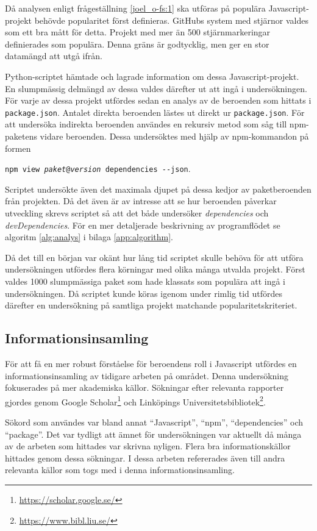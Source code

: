 Då analysen enligt frågeställning \ref{joel_o-fs:1} ska utföras på populära Javascript-projekt behövde popularitet först definieras. GitHubs system med stjärnor valdes som ett bra mått för detta. Projekt med mer än 500 stjärnmarkeringar definierades som populära. Denna gräns är godtycklig, men ger en stor datamängd att utgå ifrån.

Python-scriptet hämtade och lagrade information om dessa Javascript-projekt. En slumpmässig delmängd av dessa valdes därefter ut att ingå i undersökningen. För varje av dessa projekt utfördes sedan en analys av de beroenden som hittats i \texttt{package.json}. Antalet direkta beroenden lästes ut direkt ur \texttt{package.json}. För att undersöka indirekta beroenden användes en rekursiv metod som såg till npm-paketens vidare beroenden. Dessa undersöktes med hjälp av npm-kommandon på formen

\begin{center}
  \texttt{npm view \textit{paket}@\textit{version} dependencies \hyphen\hyphen json}.
\end{center}

Scriptet undersökte även det maximala djupet på dessa kedjor av paketberoenden från projekten. Då det även är av intresse att se hur beroenden påverkar utveckling skrevs scriptet så att det både undersöker \textit{dependencies} och \textit{devDependencies}. För en mer detaljerade beskrivning av programflödet se algoritm \ref{alg:analys} i bilaga \ref{app:algorithm}.

Då det till en början var okänt hur lång tid scriptet skulle behöva för att utföra undersökningen utfördes flera körningar med olika många utvalda projekt. Först valdes 1000 slumpmässiga paket som hade klassats som populära att ingå i undersökningen. Då scriptet kunde köras igenom under rimlig tid utfördes därefter en undersökning på samtliga projekt matchande popularitetskriteriet.

\subsection{Informationsinsamling}
För att få en mer robust förståelse för beroendens roll i Javascript utfördes en informationsinsamling av tidigare arbeten på området. Denna undersökning fokuserades på mer akademiska källor. Sökningar efter relevanta rapporter gjordes genom Google Scholar\footnote{\url{https://scholar.google.se/}} och Linköpings Universitetsbibliotek\footnote{\url{https://www.bibl.liu.se/}}.

Sökord som användes var bland annat ``Javascript'', ``npm'', ``dependencies'' och ``package''. Det var tydligt att ämnet för undersökningen var aktuellt då många av de arbeten som hittades var skrivna nyligen. Flera bra informationskällor hittades genom dessa sökningar. I dessa arbeten refererades även till andra relevanta källor som togs med i denna informationsinsamling.

